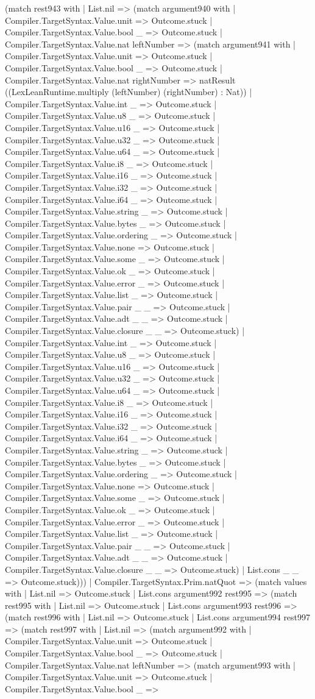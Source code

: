 \documentclass[11pt]{article}
\begin{document}
(match rest943 with | List.nil => (match argument940 with | Compiler.TargetSyntax.Value.unit => Outcome.stuck | Compiler.TargetSyntax.Value.bool \_ => Outcome.stuck | Compiler.TargetSyntax.Value.nat leftNumber => (match argument941 with | Compiler.TargetSyntax.Value.unit => Outcome.stuck | Compiler.TargetSyntax.Value.bool \_ => Outcome.stuck | Compiler.TargetSyntax.Value.nat rightNumber => natResult ((LexLeanRuntime.multiply (leftNumber) (rightNumber) : Nat)) | Compiler.TargetSyntax.Value.int \_ => Outcome.stuck | Compiler.TargetSyntax.Value.u8 \_ => Outcome.stuck | Compiler.TargetSyntax.Value.u16 \_ => Outcome.stuck | Compiler.TargetSyntax.Value.u32 \_ => Outcome.stuck | Compiler.TargetSyntax.Value.u64 \_ => Outcome.stuck | Compiler.TargetSyntax.Value.i8 \_ => Outcome.stuck | Compiler.TargetSyntax.Value.i16 \_ => Outcome.stuck | Compiler.TargetSyntax.Value.i32 \_ => Outcome.stuck | Compiler.TargetSyntax.Value.i64 \_ => Outcome.stuck | Compiler.TargetSyntax.Value.string \_ => Outcome.stuck | Compiler.TargetSyntax.Value.bytes \_ => Outcome.stuck | Compiler.TargetSyntax.Value.ordering \_ => Outcome.stuck | Compiler.TargetSyntax.Value.none => Outcome.stuck | Compiler.TargetSyntax.Value.some \_ => Outcome.stuck | Compiler.TargetSyntax.Value.ok \_ => Outcome.stuck | Compiler.TargetSyntax.Value.error \_ => Outcome.stuck | Compiler.TargetSyntax.Value.list \_ => Outcome.stuck | Compiler.TargetSyntax.Value.pair \_ \_ => Outcome.stuck | Compiler.TargetSyntax.Value.adt \_ \_ => Outcome.stuck | Compiler.TargetSyntax.Value.closure \_ \_ => Outcome.stuck) | Compiler.TargetSyntax.Value.int \_ => Outcome.stuck | Compiler.TargetSyntax.Value.u8 \_ => Outcome.stuck | Compiler.TargetSyntax.Value.u16 \_ => Outcome.stuck | Compiler.TargetSyntax.Value.u32 \_ => Outcome.stuck | Compiler.TargetSyntax.Value.u64 \_ => Outcome.stuck | Compiler.TargetSyntax.Value.i8 \_ => Outcome.stuck | Compiler.TargetSyntax.Value.i16 \_ => Outcome.stuck | Compiler.TargetSyntax.Value.i32 \_ => Outcome.stuck | Compiler.TargetSyntax.Value.i64 \_ => Outcome.stuck | Compiler.TargetSyntax.Value.string \_ => Outcome.stuck | Compiler.TargetSyntax.Value.bytes \_ => Outcome.stuck | Compiler.TargetSyntax.Value.ordering \_ => Outcome.stuck | Compiler.TargetSyntax.Value.none => Outcome.stuck | Compiler.TargetSyntax.Value.some \_ => Outcome.stuck | Compiler.TargetSyntax.Value.ok \_ => Outcome.stuck | Compiler.TargetSyntax.Value.error \_ => Outcome.stuck | Compiler.TargetSyntax.Value.list \_ => Outcome.stuck | Compiler.TargetSyntax.Value.pair \_ \_ => Outcome.stuck | Compiler.TargetSyntax.Value.adt \_ \_ => Outcome.stuck | Compiler.TargetSyntax.Value.closure \_ \_ => Outcome.stuck) | List.cons \_ \_ => Outcome.stuck))) | Compiler.TargetSyntax.Prim.natQuot => (match values with | List.nil => Outcome.stuck | List.cons argument992 rest995 => (match rest995 with | List.nil => Outcome.stuck | List.cons argument993 rest996 => (match rest996 with | List.nil => Outcome.stuck | List.cons argument994 rest997 => (match rest997 with | List.nil => (match argument992 with | Compiler.TargetSyntax.Value.unit => Outcome.stuck | Compiler.TargetSyntax.Value.bool \_ => Outcome.stuck | Compiler.TargetSyntax.Value.nat leftNumber => (match argument993 with | Compiler.TargetSyntax.Value.unit => Outcome.stuck | Compiler.TargetSyntax.Value.bool \_ => 
\end{document}
